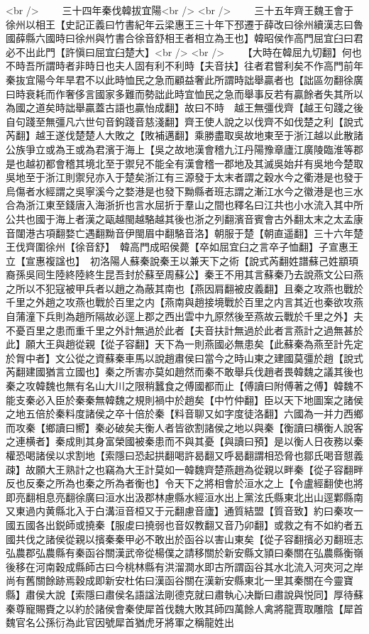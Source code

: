 <br />
　　三十四年秦伐韓拔宜陽<br />
<br />
　　三十五年齊王魏王會于徐州以相王【史記正義曰竹書紀年云梁惠王三十年下邳遷于薛改曰徐州續漢志曰魯國薛縣六國時曰徐州與竹書合徐音舒相王者相立為王也】韓昭侯作高門屈宜臼曰君必不出此門【許愼曰屈宜臼楚大】<br />
<br />
　　【大時在韓屈九切翻】何也不時吾所謂時者非時日也夫人固有利不利時【夫音扶】往者君嘗利矣不作高門前年秦抜宜陽今年旱君不以此時恤民之急而顧益奢此所謂時詘舉贏者也【詘區勿翻徐廣曰時衰耗而作奢侈言國家多難而勢詘此時宜恤民之急而舉事反若有贏餘者失其所以為國之道矣時詘舉贏蓋古語也贏怡成翻】故曰不時　越王無彊伐齊【越王句踐之後自句踐至無彊凡六世句音鉤踐音慈淺翻】齊王使人說之以伐齊不如伐楚之利【說式芮翻】越王遂伐楚楚人大敗之【敗補邁翻】乘勝盡取吳故地東至于浙江越以此散諸公族爭立或為王或為君濱于海上【吳之故地漢會稽九江丹陽豫章廬江廣陵臨淮等郡是也越初都會稽其境北至于禦兒不能全有漢會稽一郡地及其滅吳始幷有吳地今楚取吳地至于浙江則禦兒亦入于楚矣浙江有三源發于太末者謂之穀水今之衢港是也發于烏傷者水經謂之吳寧溪今之婺港是也發下黝縣者班志謂之漸江水今之徽港是也三水合為浙江東至錢唐入海浙折也言水屈折于羣山之間也釋名曰江共也小水流入其中所公共也國于海上者漢之甌越閩越駱越其後也浙之列翻濱音賓會古外翻太末之太孟康音闥港古項翻婺亡遇翻黝音伊閩眉中翻駱音洛】朝服于楚【朝直遥翻】三十六年楚王伐齊圍徐州【徐音舒】　韓高門成昭侯薨【卒如屈宜臼之言卒子恤翻】子宣惠王立【宣惠複諡也】　初洛陽人蘇秦說秦王以兼天下之術【說式芮翻姓譜蘇己姓顓頊裔孫吳囘生陸終陸終生昆吾封於蘇至周蘇公】秦王不用其言蘇秦乃去說燕文公曰燕之所以不犯寇被甲兵者以趙之為蔽其南也【燕因肩翻被皮義翻】且秦之攻燕也戰於千里之外趙之攻燕也戰於百里之内【燕南與趙接境戰於百里之内言其近也秦欲攻燕自蒲潼下兵則為趙所隔故必逕上郡之西出雲中九原然後至燕故云戰於千里之外】夫不憂百里之患而重千里之外計無過於此者【夫音扶計無過於此者言燕計之過無甚於此】願大王與趙從親【從子容翻】天下為一則燕國必無患矣【此蘇秦為燕至計先定於胷中者】文公從之資蘇秦車馬以說趙肅侯曰當今之時山東之建國莫彊於趙【說式芮翻建國猶言立國也】秦之所害亦莫如趙然而秦不敢舉兵伐趙者畏韓魏之議其後也秦之攻韓魏也無有名山大川之限稍蠶食之傅國都而止【傅讀曰附傅著之傅】韓魏不能支秦必入臣於秦秦無韓魏之規則禍中於趙矣【中竹仲翻】臣以天下地圖案之諸侯之地五倍於秦料度諸侯之卒十倍於秦【料音聊又如字度徒洛翻】六國為一并力西鄉而攻秦【鄉讀曰嚮】秦必破矣夫衡人者皆欲割諸侯之地以與秦【衡讀曰横衡人說客之連横者】秦成則其身富榮國被秦患而不與其憂【與讀曰預】是以衡人日夜務以秦權恐喝諸侯以求割地【索隱曰恐起拱翻喝許曷翻又呼曷翻謂相恐脅也鄒氏喝音憇義疎】故願大王熟計之也竊為大王計莫如一韓魏齊楚燕趙為從親以畔秦【從子容翻畔反也反秦之所為也秦之所為者衡也】令天下之將相會於洹水之上【令盧經翻使也將即亮翻相息亮翻徐廣曰洹水出汲郡林慮縣水經洹水出上黨泫氏縣東北出山逕鄴縣南又東過内黄縣北入于白溝洹音桓又于元翻慮音廬】通質結盟【質音致】約曰秦攻一國五國各出鋭師或撓秦【服䖍曰撓弱也音奴教翻又音乃卯翻】或救之有不如約者五國共伐之諸侯從親以擯秦秦甲必不敢出於函谷以害山東矣【從子容翻擯必刃翻班志弘農郡弘農縣有秦函谷關漢武帝從楊僕之請移關於新安縣文頴曰秦關在弘農縣衡嶺後移在河南穀成縣師古曰今桃林縣有洪溜澗水即古所謂函谷其水北流入河夾河之岸尚有舊關餘跡焉穀成即新安杜佑曰漢函谷關在漢新安縣東北一里其秦關在今靈寶縣】肅侯大說【索隱曰肅侯名語諡法剛德克就曰肅執心决斷曰肅說與悦同】厚待蘇秦尊寵賜賚之以約於諸侯會秦使犀首伐魏大敗其師四萬餘人禽將龍賈取雕陰【犀首魏官名公孫衍為此官因號犀首猶虎牙將軍之稱龍姓出